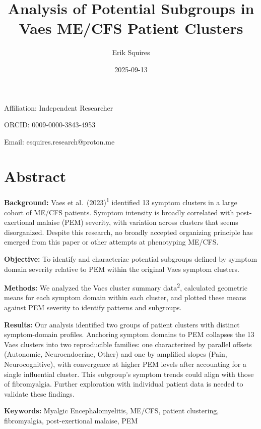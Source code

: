 \documentclass[
  letterpaper,
  DIV=11,
  numbers=noendperiod]{scrartcl}
\title{Analysis of Potential Subgroups in Vaes ME/CFS Patient Clusters}
\author{Erik Squires}
\date{2025-09-13}
\begin{document}
\maketitle


Affiliation: Independent Researcher

ORCID: 0009-0000-3843-4953

Email: esquires.research@proton.me

\section*{Abstract}\label{abstract}

\textbf{Background:} Vaes et al.~(2023)\textsuperscript{1} identified 13
symptom clusters in a large cohort of ME/CFS patients. Symptom intensity
is broadly correlated with post-exertional malaise (PEM) severity, with
variation across clusters that seems disorganized. Despite this
research, no broadly accepted organizing principle has emerged from this
paper or other attempts at phenotyping ME/CFS.

\textbf{Objective:} To identify and characterize potential subgroups
defined by symptom domain severity relative to PEM within the original
Vaes symptom clusters.

\textbf{Methods:} We analyzed the Vaes cluster summary
data\textsuperscript{2}, calculated geometric means for each symptom
domain within each cluster, and plotted these means against PEM severity
to identify patterns and subgroups.

\textbf{Results:} Our analysis identified two groups of patient clusters
with distinct symptom-domain profiles. Anchoring symptom domains to PEM
collapses the 13 Vaes clusters into two reproducible families: one
characterized by parallel offsets (Autonomic, Neuroendocrine, Other) and
one by amplified slopes (Pain, Neurocognitive), with convergence at
higher PEM levels after accounting for a single influential cluster.
This subgroup's symptom trends could align with those of fibromyalgia.
Further exploration with individual patient data is needed to validate
these findings.

\textbf{Keywords:} Myalgic Encephalomyelitis, ME/CFS, patient
clustering, fibromyalgia, post-exertional malaise, PEM

\newpage{}

\setcounter{tocdepth}{2}
\tableofcontents

\newpage{}

\listoffigures
\listoftables
\end{document}
